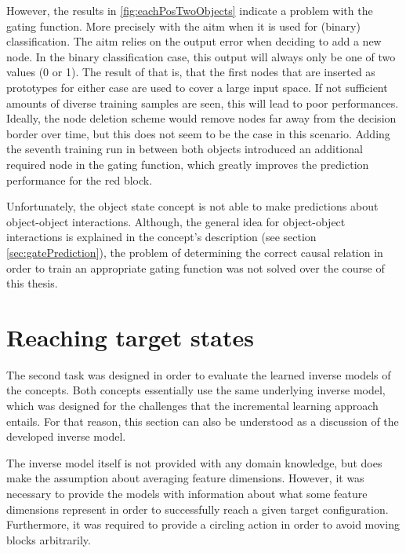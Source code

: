 However, the results in \ref{fig:eachPosTwoObjects} indicate a problem with the gating function. More precisely with the \gls{aitm} when it is used for (binary) classification. The \gls{aitm} relies on the output error when deciding to add a new node. In the binary classification case, this output will always only be one of two values (0 or 1). The result of that is, that the first nodes that are inserted as prototypes for either case are used to cover a large input space. If not sufficient amounts of diverse training samples are seen, this will lead to poor performances. Ideally, the node deletion scheme would remove nodes far away from the decision border over time, but this does not seem to be the case in this scenario. Adding the seventh training run in between both objects introduced an additional required node in the gating function, which greatly improves the prediction performance for the red block.

Unfortunately, the object state concept is not able to make predictions about object-object interactions. Although, the general idea for object-object interactions is explained in the concept's description (see section \ref{sec:gatePrediction}), the problem of determining the correct causal relation in order to train an appropriate gating function was not solved over the course of this thesis.

\section{Reaching target states}

The second task was designed in order to evaluate the learned inverse models of the concepts. Both concepts essentially use the same underlying inverse model, which was designed for the challenges that the incremental learning approach entails. 
For that reason, this section can also be understood as a discussion of the developed inverse model.

The inverse model itself is not provided with any domain knowledge, but does make the assumption about averaging feature dimensions. 
However, it was necessary to provide the models with information about what some feature dimensions represent in order to successfully reach a given target configuration. 
Furthermore, it was required to provide a circling action in order to avoid moving blocks arbitrarily.

